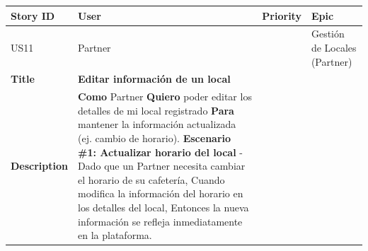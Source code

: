 {\def\LTcaptype{none} %
\begin{longtable}[]{@{}
  >{\raggedright\arraybackslash}p{}
  >{\raggedright\arraybackslash}p{}
  >{\raggedright\arraybackslash}p{}
  >{\raggedright\arraybackslash}p{}@{}}
\toprule\noalign{}
\begin{minipage}[b]{\linewidth}\raggedright
Story ID
\end{minipage} & \begin{minipage}[b]{\linewidth}\raggedright
User
\end{minipage} & \begin{minipage}[b]{\linewidth}\raggedright
Priority
\end{minipage} & \begin{minipage}[b]{\linewidth}\raggedright
Epic
\end{minipage} \\
\midrule\noalign{}
\endhead
\bottomrule\noalign{}
\endlastfoot
US11 & Partner & 3 & Gestión de Locales (Partner) \\
\textbf{Title} & \textbf{Editar información de un local} & & \\
\textbf{Description} & \textbf{Como} Partner \textbf{Quiero} poder
editar los detalles de mi local registrado \textbf{Para} mantener la
información actualizada (ej. cambio de horario). \textbf{Escenario \#1:
Actualizar horario del local} - Dado que un Partner necesita cambiar el
horario de su cafetería, Cuando modifica la información del horario en
los detalles del local, Entonces la nueva información se refleja
inmediatamente en la plataforma. & & \\
\end{longtable}
}

